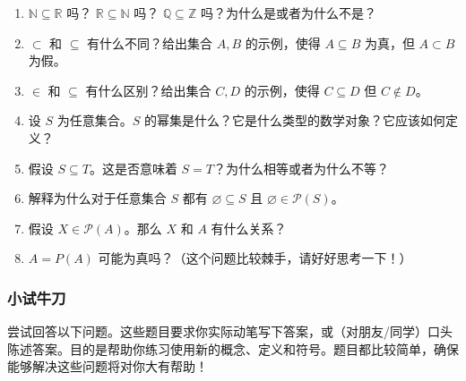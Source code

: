 \begin{enumerate}[label=(\arabic*)]
    \item $\mathbb{N} \subseteq \mathbb{R}$ 吗？ $\mathbb{R} \subseteq \mathbb{N}$ 吗？ $\mathbb{Q} \subseteq \mathbb{Z}$ 吗？为什么是或者为什么不是？
    \item $\subset$ 和 $\subseteq$ 有什么不同？给出集合 $A, B$ 的示例，使得 $A \subseteq B$ 为真，但 $A \subset B$ 为假。
    \item $\in$ 和 $\subseteq$ 有什么区别？给出集合 $C, D$ 的示例，使得 $C \subseteq D$ 但 $C \notin D$。
    \item 设 $S$ 为任意集合。$S$ 的幂集是什么？它是什么类型的数学对象？它应该如何定义？
    \item 假设 $S \subseteq T$。这是否意味着 $S = T$？为什么相等或者为什么不等？
    \item 解释为什么对于任意集合 $S$ 都有 $\varnothing \subseteq S$ 且 $\varnothing \in \mathcal{P}(S)$。
    \item 假设 $X \in \mathcal{P}(A)$。那么 $X$ 和 $A$ 有什么关系？
    \item $A = P(A)$ 可能为真吗？（这个问题比较棘手，请好好思考一下！）
\end{enumerate}

\subsubsection*{小试牛刀}

尝试回答以下问题。这些题目要求你实际动笔写下答案，或（对朋友/同学）口头陈述答案。目的是帮助你练习使用新的概念、定义和符号。题目都比较简单，确保能够解决这些问题将对你大有帮助！

